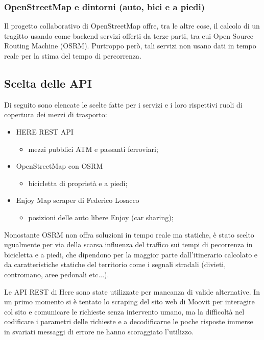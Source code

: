 \subsubsection{OpenStreetMap e dintorni (auto, bici e a piedi)}

Il progetto collaborativo di OpenStreetMap offre, tra le altre cose, il calcolo di un tragitto usando come backend servizi offerti da terze parti, tra cui Open Source Routing Machine (OSRM). Purtroppo però, tali servizi non usano dati in tempo reale per la stima del tempo di percorrenza\cite{osm}.

\subsection{Scelta delle API}

Di seguito sono elencate le scelte fatte per i servizi e i loro rispettivi ruoli di copertura dei mezzi di trasporto:

\begin{itemize}
	\item HERE REST API\cite{herewegoapi}
	\begin{itemize}
		\item mezzi pubblici ATM e passanti ferroviari;
	\end{itemize}

	\item OpenStreetMap con OSRM\cite{openstreetmap}
	\begin{itemize}
		\item bicicletta di proprietà e a piedi;
	\end{itemize}

	\item Enjoy Map scraper di Federico Losacco\cite{enjoycarsharing}\cite{losaccofederico}
	\begin{itemize}
		\item posizioni delle auto libere Enjoy (car sharing);
	\end{itemize}
\end{itemize}

Nonostante OSRM non offra soluzioni in tempo reale ma statiche, è stato scelto ugualmente per via della scarsa influenza del traffico sui tempi di pecorrenza in bicicletta e a piedi, che dipendono per la maggior parte dall'itinerario calcolato e da caratteristiche statiche del territorio come i segnali stradali (divieti, contromano, aree pedonali etc...).

Le API REST di Here sono state utilizzate per mancanza di valide alternative. In un primo momento si è tentato lo scraping del sito web di Moovit per interagire col sito e comunicare le richieste senza intervento umano, ma la difficoltà nel codificare i parametri delle richieste e a decodificarne le poche risposte immerse in svariati messaggi di errore ne hanno scoraggiato l'utilizzo.

